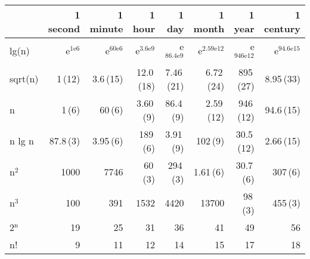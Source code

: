 \documentclass[11pt]{article}
\begin{document}
\begin{center}
\begin{tabular}{lrrrrrrr}
 & 1 second & 1 minute & 1 hour & 1 day & 1 month & 1 year & 1 century\\
\hline
lg(n) & e$^{\text{1e6}}$ & e$^{\text{60e6}}$ & e$^{\text{3.6e9}}$ & e$^{\text{86.4e9}}$ & e$^{\text{2.59e12}}$ & e$^{\text{946e12}}$ & e$^{\text{94.6e15}}$\\
sqrt(n) & 1\,(12) & 3.6\,(15) & 12.0\,(18) & 7.46\,(21) & 6.72\,(24) & 895\,(27) & 8.95\,(33)\\
n & 1\,(6) & 60\,(6) & 3.60\,(9) & 86.4\,(9) & 2.59\,(12) & 946\,(12) & 94.6\,(15)\\
n lg n & 87.8\,(3) & 3.95\,(6) & 189\,(6) & 3.91\,(9) & 102\,(9) & 30.5\,(12) & 2.66\,(15)\\
n$^{\text{2}}$ & 1000 & 7746 & 60\,(3) & 294\,(3) & 1.61\,(6) & 30.7\,(6) & 307\,(6)\\
n$^{\text{3}}$ & 100 & 391 & 1532 & 4420 & 13700 & 98\,(3) & 455\,(3)\\
2$^{\text{n}}$ & 19 & 25 & 31 & 36 & 41 & 49 & 56\\
n! & 9 & 11 & 12 & 14 & 15 & 17 & 18\\
\end{tabular}
\end{center}
\end{document}
